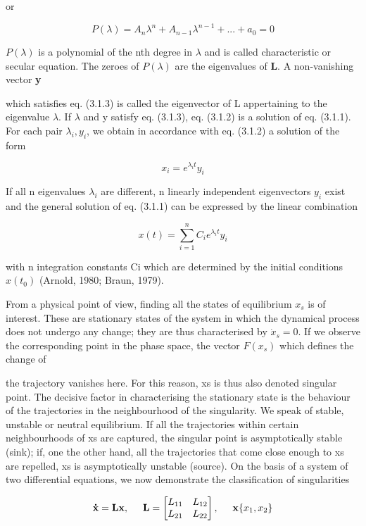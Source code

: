 \documentclass[12pt]{article}
\begin{document}
or

\[
P(\lambda) = A_n \lambda^n + A_{n-1} \lambda^{n-1} + ... + a_0 = 0
\]

$P(\lambda)$ is a polynomial of the nth degree in $\lambda$ and is called characteristic or secular
equation. The zeroes of $P(\lambda)$ are the eigenvalues of \textbf{L}. A non-vanishing vector \textbf{y} 


which satisfies eq. (3.1.3) is called the eigenvector of L appertaining to the eigenvalue
$\lambda$. If $\lambda$ and y satisfy eq. (3.1.3), eq. (3.1.2) is a solution of eq. (3.1.1). For each
pair $\lambda_i,y_i$, we obtain in accordance with eq. (3.1.2) a solution of the form

\[
x_i = e^{\lambda_i t}y_i 
\]

If all n eigenvalues $\lambda_i$ are different, n linearly independent eigenvectors $y_i$ exist and
the general solution of eq. (3.1.1) can be expressed by the linear combination

\[
x(t) = \sum_{i=1}^n C_i e^{\lambda_i t} y_i
\]

with n integration constants Ci which are determined by the initial conditions $x(t_0)$
(Arnold, 1980; Braun, 1979).

\hfill

From a physical point of view, finding all the states of equilibrium $x_s$ is of interest.
These are stationary states of the system in which the dynamical process does
not undergo any change; they are thus characterised by $\dot{x}_s = 0$. If we observe the
corresponding point in the phase space, the vector $F(x_s)$ which defines the change of 


the trajectory vanishes here. For this reason, xs is thus also denoted singular point.
The decisive factor in characterising the stationary state is the behaviour of the
trajectories in the neighbourhood of the singularity. We speak of stable, unstable
or neutral equilibrium. If all the trajectories within certain neighbourhoods of xs are
captured, the singular point is asymptotically stable (sink); if, one the other hand,
all the trajectories that come close enough to xs are repelled, xs is asymptotically
unstable (source). On the basis of a system of two differential equations, we now
demonstrate the classification of singularities

\[
\mathbf{\dot{x} = Lx}, \hspace{5mm} \mathbf{L} = \begin{bmatrix}
L_{11} &  L_{12} \\
L_{21} & L_{22} \\
\end{bmatrix}, \hspace{5mm} \mathbf{x} \{x_1, x_2 \}
\]
\end{document}
